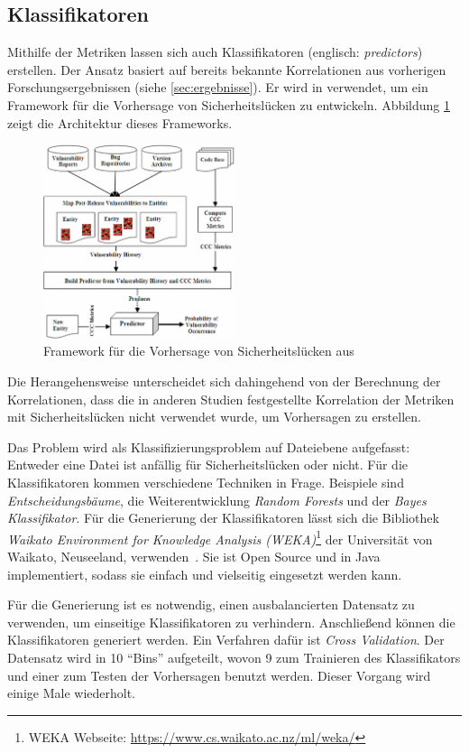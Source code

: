 \subsection{Klassifikatoren}
Mithilfe der Metriken lassen sich auch Klassifikatoren (englisch: \emph{predictors}) erstellen.
Der Ansatz basiert auf bereits bekannte Korrelationen aus vorherigen Forschungsergebnissen (siehe \ref{sec:ergebnisse}).
Er wird in \cite{chowdhury_zulkernine_2009} verwendet, um ein Framework für die Vorhersage von Sicherheitslücken zu entwickeln.
Abbildung \ref{fig:framework} zeigt die Architektur dieses Frameworks.
\begin{figure}
	\includegraphics[width=0.5\textwidth]{img/framework.png}
	\caption{Framework für die Vorhersage von Sicherheitslücken aus \cite{chowdhury_zulkernine_2009}}
	\label{fig:framework}
\end{figure}
Die Herangehensweise unterscheidet sich dahingehend von der Berechnung der Korrelationen, dass die in anderen Studien festgestellte Korrelation der Metriken mit Sicherheitslücken nicht verwendet wurde, um Vorhersagen zu erstellen.

Das Problem wird als Klassifizierungsproblem auf Dateiebene aufgefasst:
Entweder eine Datei ist anfällig für Sicherheitslücken oder nicht.
Für die Klassifikatoren kommen verschiedene Techniken in Frage.
Beispiele sind \emph{Entscheidungsbäume}\cite{decision_trees}, die Weiterentwicklung \emph{Random Forests} und der \emph{Bayes Klassifikator}.
Für die Generierung der Klassifikatoren lässt sich die Bibliothek \emph{Waikato Environment for Knowledge Analysis (WEKA)}\footnote{WEKA Webseite: \url{https://www.cs.waikato.ac.nz/ml/weka/}} der Universität von Waikato, Neuseeland, verwenden~\cite{chowdhury_zulkernine_2009}.
Sie ist Open Source und in Java implementiert, sodass sie einfach und vielseitig eingesetzt werden kann.

Für die Generierung ist es notwendig, einen ausbalancierten Datensatz zu verwenden, um einseitige Klassifikatoren zu verhindern.
Anschließend können die Klassifikatoren generiert werden.
Ein Verfahren dafür ist \emph{Cross Validation}\cite{chowdhury_zulkernine_2009}.
Der Datensatz wird in 10 "`Bins"' aufgeteilt, wovon 9 zum Trainieren des Klassifikators und einer zum Testen der Vorhersagen benutzt werden.
Dieser Vorgang wird einige Male wiederholt.

